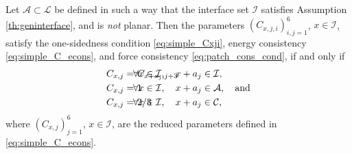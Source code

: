 \documentclass[12pt, reqno, a4paper]{amsart}
\numberwithin{equation}{section}
\numberwithin{theorem}{section}
\numberwithin{remark}{section}
\begin{document}
\begin{proposition}
  \label{th:params:corner}
  Let ${\mathcal{A}} \subset {\mathcal{L}}$ be defined in such a way that the interface set
  ${\mathcal{I}}$ satisfies Assumption \ref{th:geninterface}, and is {\em not}
  planar.  Then the parameters $(C_{x,j,i})_{i,j = 1}^6$, $x \in {\mathcal{I}}$,
  satisfy the one-sidedness condition \eqref{eq:simple_Cxji}, energy
  consistency \eqref{eq:simple_C_econs}, and force consistency
  \eqref{eq:patch_cons_cond}, if and only if
  \begin{align}
    \label{eq:interface_C_ccons1}
    C_{x,j} =~& C_{x+a_j, j+3} \hspace{-2cm}  &&\forall x \in {\mathcal{I}}, \quad
    x+a_j\in{\mathcal{I}}, \\
    \label{eq:interface_C_ccons2}
    C_{x,j} =~& 1  \hspace{-2cm} &&\forall x \in {\mathcal{I}}, \quad x+a_j\in{\mathcal{A}}, \quad \text{and}\\
    \label{eq:interface_C_ccons3}
    C_{x,j} =~& 2/3 \hspace{-2cm} &&\forall x \in {\mathcal{I}}, \quad x+a_j\in{\mathcal{C}},
  \end{align}
  where $(C_{x,j})_{j = 1}^6$, $x \in {\mathcal{I}}$, are the reduced parameters
  defined in \eqref{eq:simple_C_econs}.
\end{proposition}
\end{document}

